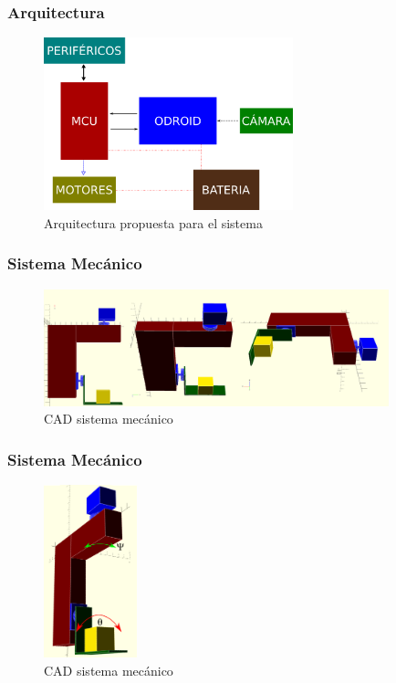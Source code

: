 \documentclass[11pt]{beamer}
\begin{document}
  \begin{frame}
    \frametitle{Arquitectura}
    \begin{figure}
      \includegraphics[height=5cm, keepaspectratio]{images/arquitectura.png}
      \caption{Arquitectura propuesta para el sistema}
    \end{figure}
  \end{frame}
  \begin{frame}
    \frametitle{Sistema Mecánico}
    \begin{figure}
      \includegraphics[width=10cm, keepaspectratio]{images/cad.png}
      \caption{CAD sistema mecánico}
    \end{figure}
  \end{frame}
  \begin{frame}
    \frametitle{Sistema Mecánico}
    \begin{figure}
      \includegraphics[height=5cm, keepaspectratio]{images/cad-2.png}
      \caption{CAD sistema mecánico}
    \end{figure}
  \end{frame}
\end{document}
